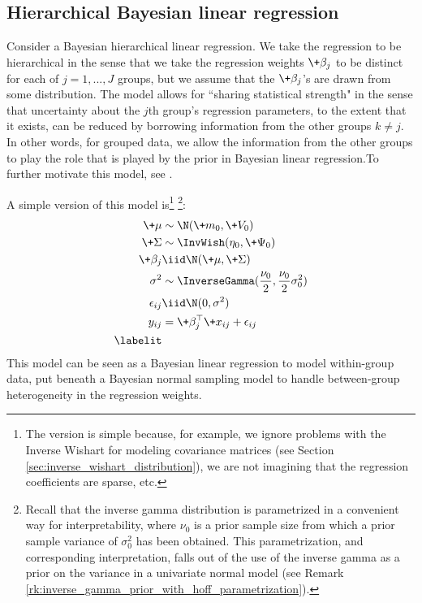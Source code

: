 \documentclass{article} %
\begin{document}
\subsection{Hierarchical Bayesian linear regression} \label{sec:hierarchial_linear_regression}

Consider a Bayesian hierarchical linear regression.    We take the regression to be hierarchical in the sense that we take the regression weights $\+\beta_j$ to be distinct for each of $j=1,...,J$ groups,  but we assume that the $\+\beta_j$'s are drawn from some distribution.     The model allows for ``sharing statistical strength" in the sense that uncertainty about the $j$th group's regression parameters,  to the extent that it exists,  can be reduced by borrowing information from the other groups $k \neq j$.    In other words,  for grouped data,  we allow the information from the other groups to play the role that is played by the prior in Bayesian linear regression.To further motivate this model,  see \cite{hoff2009first}.

A simple version of this model is\footnote{The version is simple because,  for example,   we ignore problems with the Inverse Wishart for modeling covariance matrices (see Section \ref{sec:inverse_wishart_distribution}),  we are not imagining that the regression coefficients are sparse,  etc.} \footnote{Recall that the inverse gamma distribution is parametrized in a convenient way for interpretability,  where $\nu_0$ is a prior sample size from which a  prior sample variance of $\sigma_0^2$ has been obtained.  This parametrization,  and corresponding interpretation,  falls out of the use of the inverse gamma as a prior on the variance in a univariate normal model (see Remark \ref{rk:inverse_gamma_prior_with_hoff_parametrization}). }:
\begin{align*}
\+\mu &\sim  \N (\+m_0,\+V_0) \\
\+\Sigma &\sim \InvWish(\eta_0,  \+\Psi_0) \\
\+\beta_j &\iid \N(\+\mu,  \+\Sigma) \\
\sigma^2 &\sim \InverseGamma (\frac{\nu_0}{2}, \frac{\nu_0}{2} \sigma_0^2) \\
\epsilon_{ij} &\iid \N(0, \sigma^2) \\
y_{ij} &= \+\beta_j^\top \+x_{ij} + \epsilon_{ij} \\
\labelit \label{eqn:hierarchical_linear_regression}
\end{align*}
This model can be seen as a Bayesian linear regression to model within-group data,  put beneath a Bayesian normal sampling model to handle between-group heterogeneity in the regression weights. 
 
\end{document}
